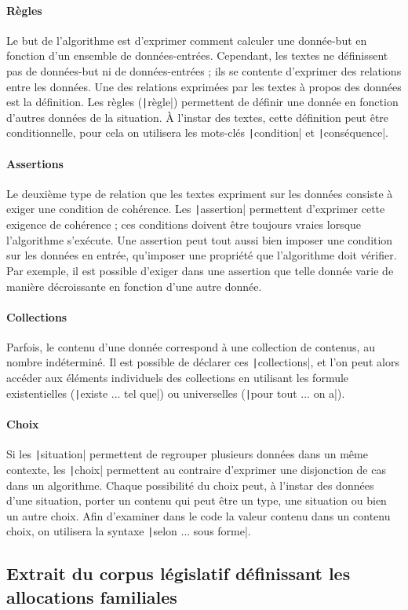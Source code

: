 \documentclass[11pt, french]{article}
\begin{document}
\paragraph{Règles} Le but de l'algorithme est d'exprimer comment calculer une donnée-but en fonction d'un ensemble de données-entrées. Cependant, les textes ne définissent pas de données-but ni de données-entrées ; ils se contente d'exprimer des relations entre les données. Une des relations exprimées par les textes à propos des données est la définition. Les règles (\texttt|règle|) permettent de définir une donnée en fonction d'autres données de la situation. À l'instar des textes, cette définition peut être conditionnelle, pour cela on utilisera les mots-clés \texttt|condition| et \texttt|conséquence|.

\paragraph{Assertions} Le deuxième type de relation que les textes expriment sur les données consiste à exiger une condition de cohérence. Les \texttt|assertion| permettent d'exprimer cette exigence de cohérence ; ces conditions doivent être toujours vraies lorsque l'algorithme s'exécute. Une assertion peut tout aussi bien imposer une condition sur les données en entrée, qu'imposer une propriété que l'algorithme doit vérifier. Par exemple, il est possible d'exiger dans une assertion que telle donnée varie de manière décroissante en fonction d'une autre donnée.

\paragraph{Collections} Parfois, le contenu d'une donnée correspond à une collection de contenus, au nombre indéterminé. Il est possible de déclarer ces \texttt|collections|, et l'on peut alors accéder aux éléments individuels des collections en utilisant les formule existentielles (\texttt|existe ... tel que|) ou universelles (\texttt|pour tout ... on a|).

\paragraph{Choix} Si les \texttt|situation| permettent de regrouper plusieurs données dans un même contexte, les \texttt|choix| permettent au contraire d'exprimer une disjonction de cas dans un algorithme. Chaque possibilité du choix peut, à l'instar des données d'une situation, porter un contenu qui peut être un type, une situation ou bien un autre choix. Afin d'examiner dans le code la valeur contenu dans un contenu choix, on utilisera la syntaxe \texttt|selon ... sous forme|.


\subsection{Extrait du corpus législatif définissant les allocations familiales}


\end{document}
